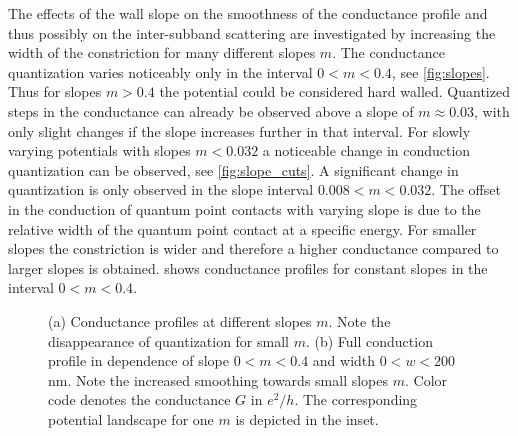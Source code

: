 The effects of the wall slope on the smoothness of the conductance profile and thus possibly on the inter-subband scattering are investigated by increasing the width of the constriction for many different slopes $m$. The conductance quantization varies noticeably only in the interval $0 < m < 0.4$, see \cref{fig:slopes}. Thus for slopes $m > 0.4$ the potential could be considered hard walled.  Quantized steps in the conductance can already be observed above a slope of $m \approx 0.03$, with only slight changes if the slope increases further in that interval. For slowly varying potentials with slopes $m<0.032$ a noticeable change in conduction quantization can be observed, see \cref{fig:slope_cuts}. A significant change in quantization is only observed in the slope interval $0.008 < m < 0.032$. The offset in the conduction of quantum point contacts with varying slope is due to the relative width of the quantum point contact at a specific energy. For smaller slopes the constriction is wider and therefore a higher conductance compared to larger slopes is obtained.  shows conductance profiles for constant slopes in the interval $0 < m < 0.4$.\par
\begin{figure}[h] 
  \caption{(a) Conductance profiles at different slopes $m$. Note the disappearance of quantization for small $m$. (b) Full conduction profile in dependence of slope $0 < m < 0.4$ and width $0 < w < 200$ nm. Note the increased smoothing towards small slopes $m$. Color code denotes the conductance $G$ in $e^2/h$. The corresponding potential landscape for one $m$ is depicted in the inset.}\label{fig:conductances}
\end{figure}
